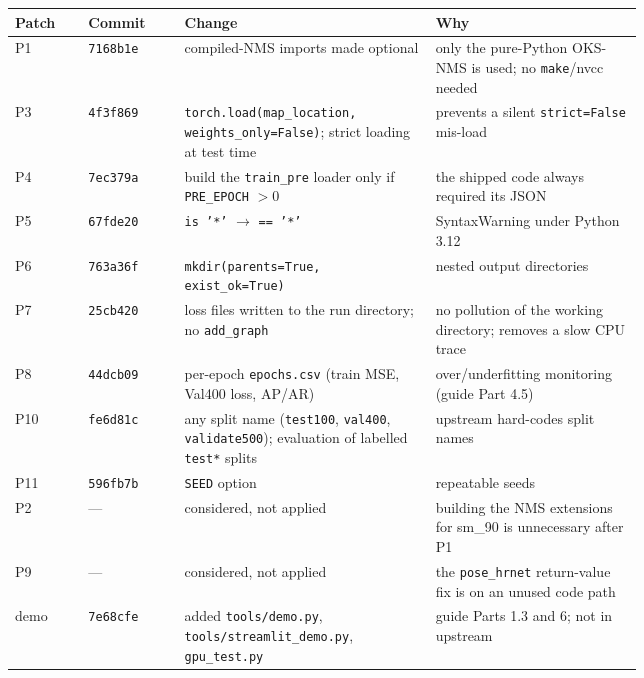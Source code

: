 \begin{tabular}{@{}llp{0.40\linewidth}p{0.33\linewidth}@{}}
\toprule
Patch & Commit & Change & Why\\
\midrule
P1 & \texttt{7168b1e} & compiled-NMS imports made optional & only the pure-Python OKS-NMS is used; no \texttt{make}/nvcc needed\\
P3 & \texttt{4f3f869} & \texttt{torch.load(map\_location, weights\_only=False)}; strict loading at test time & prevents a silent \texttt{strict=False} mis-load\\
P4 & \texttt{7ec379a} & build the \texttt{train\_pre} loader only if \texttt{PRE\_EPOCH} $>0$ & the shipped code always required its JSON\\
P5 & \texttt{67fde20} & \texttt{is '*'} $\to$ \texttt{== '*'} & SyntaxWarning under Python 3.12\\
P6 & \texttt{763a36f} & \texttt{mkdir(parents=True, exist\_ok=True)} & nested output directories\\
P7 & \texttt{25cb420} & loss files written to the run directory; no \texttt{add\_graph} & no pollution of the working directory; removes a slow CPU trace\\
P8 & \texttt{44dcb09} & per-epoch \texttt{epochs.csv} (train MSE, Val400 loss, AP/AR) & over/underfitting monitoring (guide Part 4.5)\\
P10 & \texttt{fe6d81c} & any split name (\texttt{test100}, \texttt{val400}, \texttt{validate500}); evaluation of labelled \texttt{test*} splits & upstream hard-codes split names\\
P11 & \texttt{596fb7b} & \texttt{SEED} option & repeatable seeds\\
P2 & --- & considered, not applied & building the NMS extensions for sm\_90 is unnecessary after P1\\
P9 & --- & considered, not applied & the \texttt{pose\_hrnet} return-value fix is on an unused code path\\
demo & \texttt{7e68cfe} & added \texttt{tools/demo.py}, \texttt{tools/streamlit\_demo.py}, \texttt{gpu\_test.py} & guide Parts 1.3 and 6; not in upstream\\
\bottomrule
\end{tabular}
